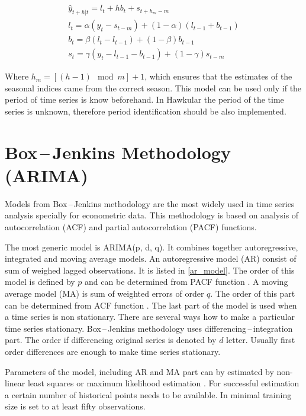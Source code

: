     \begin{gather} \label{exp_holt_winters}
        \hat{y}_{t+h|t} = l_{t} + hb_{t} + s_{t+h_m-m}\\ \nonumber
        l_t = \alpha (y_t - s_{t-m}) + (1 - \alpha) (l_{t-1} + b_{t-1}) \\ \nonumber
        b_t = \beta (l_t - l_{t-1}) + (1 - \beta)b_{t-1} \\ \nonumber
        s_t = \gamma (y_t - l_{t-1} - b_{t-1}) + (1-\gamma)s_{t-m}
    \end{gather}

    Where $h_m=[(h-1) \mod m] + 1$, which ensures that the estimates of the seasonal
    indices came from the correct season. This model can be used only if the period 
    of time series is know beforehand. In Hawkular the period of the time series is 
    unknown, therefore period identification should be also implemented.
    
    \section{Box\,--\,Jenkins Methodology (ARIMA)}
    Models from Box\,--\,Jenkins methodology are the most widely used in time series
    analysis specially for econometric data. This methodology is based on analysis of autocorrelation (ACF)
    and partial autocorrelation (PACF) functions.
    
    The most generic model is ARIMA(p, d, q). It combines together autoregressive, integrated and
    moving average models. An autoregressive model (AR) consist of sum of weighed lagged observations. It is listed
    in \ref{ar_model}. The order of this model is defined by $p$ and can be determined from PACF function \cite{cipra}.
    A moving average model (MA) is sum of weighted errors of order $q$. The order of this part can be
    determined from ACF function \cite{cipra}. The last part of the model is used when a time series is non stationary.
    There are several ways how to make a  particular time series stationary. Box\,--\,Jenkins methodology uses
    differencing\,--\,integration part. The order if differencing original series is denoted by $d$ letter. Usually
    first order differences are enough to make time series stationary.

    Parameters of the model, including AR and MA part can by estimated by non-linear
    least squares or maximum likelihood estimation \cite{brockwell}. For successful estimation a certain number of
    historical points needs to be available. In \cite{cipra} minimal training size is set to at least fifty
    observations.

